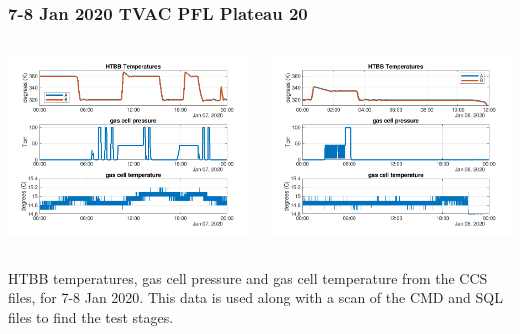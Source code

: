 \documentclass[10pt]{beamer}
\begin{document}
\begin{frame}
\frametitle{7-8 Jan 2020 TVAC PFL Plateau 20}
\begin{columns}[t]
\begin{column}{0.5\textwidth}
  \begin{centering}
  \includegraphics[width=\textwidth]{figures/css_summary_07_jan.png}
  \end{centering}\vspace{3mm}

\end{column}
\begin{column}{0.5\textwidth}  
  \begin{centering}
  \includegraphics[width=\textwidth]{figures/css_summary_08_jan.png}
  \end{centering}\vspace{3mm}

\end{column}
\end{columns}

HTBB temperatures, gas cell pressure and gas cell temperature from
the CCS files, for 7-8 Jan 2020.  This data is used along with a
scan of the CMD and SQL files to find the test stages.

\end{frame}
\end{document}
